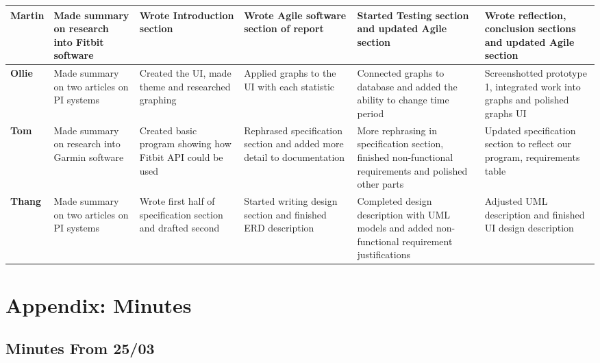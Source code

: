 \documentclass[11pt]{article}
\begin{document}
\newpage

\begin{table}[!ht]
\begin{adjustwidth}{-3cm}{-3cm}
\centering
\begin{tabular}{|p{1.5cm}|p{3.1cm}|p{3cm}|p{3cm}|p{3cm}|p{3cm}|}
\hline
\textbf{Martin} & Made summary on research into Fitbit software & Wrote Introduction section & Wrote Agile software section of report & Started Testing section and updated Agile section & Wrote reflection, conclusion sections and updated Agile section  \\
\hline
\textbf{Ollie} & Made summary on two articles on PI systems & Created the UI, made theme and researched graphing & Applied graphs to the UI with each statistic & Connected graphs to database and added the ability to change time period & Screenshotted prototype 1, integrated work into graphs and polished graphs UI\\
\hline
\textbf{Tom} & Made summary on research into Garmin software & Created basic program showing how Fitbit API could be used & Rephrased specification section and added more detail to documentation & More rephrasing in specification section, finished non-functional requirements and polished other parts & Updated specification section to reflect our program, requirements table \\
\hline
\textbf{Thang} &  Made summary on two articles on PI systems & Wrote first half of specification section and drafted second & Started writing design section and finished ERD description & Completed design description with UML models and added non-functional requirement justifications & Adjusted UML description and finished UI design description \\
\hline
\end{tabular}
\end{adjustwidth}
\end{table}



\newpage
\section{Appendix: Minutes}\label{app:minutes}
\newcommand{\tightlist}{}

\hypertarget{minutes-from-2503}{%
\subsection{Minutes From 25/03}\label{minutes-from-2503}}
\end{document}
